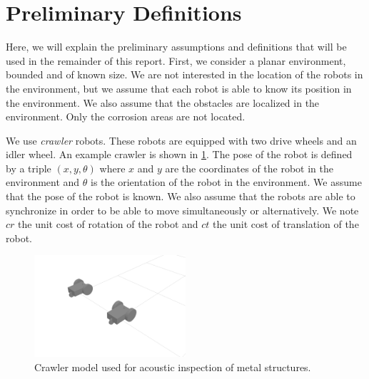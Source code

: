 \section{Preliminary Definitions}\label{sec:definitions}

Here, we will explain the preliminary assumptions and definitions that will be used in the remainder of this report.
First, we consider a planar environment, bounded and of known size.
We are not interested in the location of the robots in the environment, but we assume that each robot is able to know its position in the environment.
We also assume that the obstacles are localized in the environment.
Only the corrosion areas are not located.

We use \textit{crawler} robots. These robots are equipped with two drive wheels and an idler wheel.
An example crawler is shown in \ref{fig:crawler}.
The pose of the robot is defined by a triple $(x, y, \theta)$ where $x$ and $y$ are the coordinates of the robot in the environment and $\theta$ is the orientation of the robot in the environment.
We assume that the pose of the robot is known.
We also assume that the robots are able to synchronize in order to be able to move simultaneously or alternatively.
We note $cr$ the unit cost of rotation of the robot and $ct$ the unit cost of translation of the robot.

\begin{figure}[h!]
	\centering
	\includegraphics[width=0.5\textwidth]{graphics/crawlers.png}
	\caption{Crawler model used for acoustic inspection of metal structures.}
	\label{fig:crawler}
\end{figure}

